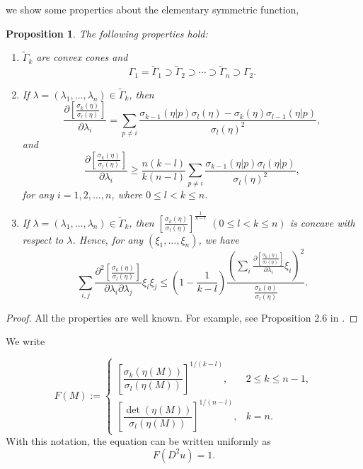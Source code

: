 \documentclass[reqno,a4paper]{amsart}
\numberwithin{equation}{section}
\newtheorem{proposition}{Proposition}[section]
\begin{document}
	we show some properties about the elementary symmetric function, 
	
	\begin{proposition}\label{prop}
		The following properties hold:
		\begin{enumerate}
			\item $\widetilde{\Gamma}_k$ are convex cones and
			\[
			\Gamma_1 = \widetilde{\Gamma}_1 \supset \widetilde{\Gamma}_2 \supset \cdots \supset \widetilde{\Gamma}_n \supset \Gamma_2.
			\]
			
			\item If $\lambda = (\lambda_1, \ldots, \lambda_n) \in \widetilde{\Gamma}_k$, then
			\[
			\frac{\partial \left[ \frac{\sigma_k(\eta)}{\sigma_l(\eta)} \right]}{\partial \lambda_i}
			= \sum_{p \neq i} \frac{\sigma_{k-1}(\eta|p)\sigma_l(\eta) - \sigma_k(\eta)\sigma_{l-1}(\eta|p)}{\sigma_l(\eta)^2},
			\]
			and
			\[
			\frac{\partial \left[ \frac{\sigma_k(\eta)}{\sigma_l(\eta)} \right]}{\partial \lambda_i}
			\geq \frac{n(k-l)}{k(n-l)} \sum_{p \neq i} \frac{\sigma_{k-1}(\eta|p)\sigma_l(\eta|p)}{\sigma_l(\eta)^2},
			\]
			for any $i = 1, 2, \ldots, n$, where $0 \leq l < k \leq n$.
			
			\item If $\lambda = (\lambda_1, \ldots, \lambda_n) \in \widetilde{\Gamma}_k$, then $\left[ \frac{\sigma_k(\eta)}{\sigma_l(\eta)} \right]^{\frac{1}{k-l}}$ $(0 \leq l < k \leq n)$ is concave with respect to $\lambda$. Hence, for any $(\xi_1, \ldots, \xi_n)$, we have
			\[
			\sum_{i,j} \frac{\partial^2 \left[ \frac{\sigma_k(\eta)}{\sigma_l(\eta)} \right]}{\partial \lambda_i \partial \lambda_j} \xi_i \xi_j
			\leq
			\left(1 - \frac{1}{k-l}\right)
			\frac{
				\left(
				\sum_i \frac{\partial \left[ \frac{\sigma_k(\eta)}{\sigma_l(\eta)} \right]}{\partial \lambda_i} \xi_i
				\right)^2
			}{
				\frac{\sigma_k(\eta)}{\sigma_l(\eta)}
			}.
			\]
		\end{enumerate}
	\end{proposition}
	\begin{proof}
		All the properties are well known. For example, see Proposition 2.6 in \cite{CDH22}.
	\end{proof}
	
	We write
	
	\[
	F(M) := 
	\begin{cases} 
		\left[ \dfrac{\sigma_k(\eta(M))}{\sigma_l(\eta(M))} \right]^{1/(k-l)}, & 2 \le k \le n-1, \\[1.2ex]
		\left[ \dfrac{\det(\eta(M))}{\sigma_l(\eta(M))} \right]^{1/(n-l)}, & k = n.
	\end{cases}
	\]
	With this notation, the equation can be written uniformly as
	\begin{equation}
		F(D^2 u) = 1.
	\end{equation}
	
\end{document}
